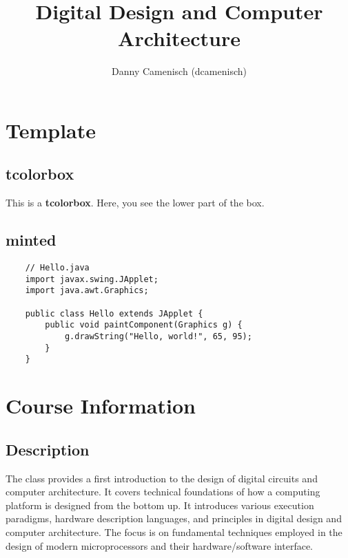 \documentclass[a4paper]{report}
\title{Digital Design and Computer Architecture}
\author{Danny Camenisch (dcamenisch)}
\begin{document}
\maketitle
\tableofcontents



\chapter{Template}
\section{tcolorbox}

\begin{tcolorbox}[colback=dcWhite,colframe=dcOrange,title=\textbf{My Heading}]
    This is a \textbf{tcolorbox}.
\tcblower
    Here, you see the lower part of the box.
\end{tcolorbox}

\section{minted}

\begin{verbatim}
    // Hello.java
    import javax.swing.JApplet;
    import java.awt.Graphics;
    
    public class Hello extends JApplet {
        public void paintComponent(Graphics g) {
            g.drawString("Hello, world!", 65, 95);
        }    
    }
\end{verbatim}




\chapter{Course Information}
\section{Description}

The class provides a first introduction to the design of digital circuits and 
computer architecture. It covers technical foundations of how a computing platform 
is designed from the bottom up. It introduces various execution paradigms, hardware 
description languages, and principles in digital design and computer architecture. 
The focus is on fundamental techniques employed in the design of modern microprocessors 
and their hardware/software interface.
\bigskip
\end{document}
